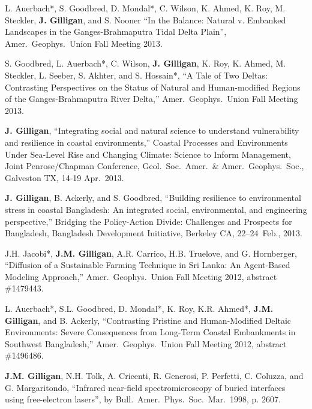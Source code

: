     \item L. Auerbach*, S. Goodbred, D. Mondal*, C. Wilson, K. Ahmed, K. Roy, M. Steckler, \textbf{J. Gilligan}, and S. Nooner
    \enquote{In the Balance: Natural v. Embanked Landscapes in the Ganges-Brahmaputra Tidal Delta Plain},
    Amer.\ Geophys.\ Union Fall Meeting 2013.
    
    \item S. Goodbred, L. Auerbach*, C. Wilson, \textbf{J. Gilligan}, K. Roy, K. Ahmed, M. Steckler, L. Seeber, S. Akhter, and S. Hossain*,
    \enquote{A Tale of Two Deltas: Contrasting Perspectives on the Status of Natural and Human-modified Regions of the Ganges-Brahmaputra River Delta,}
    Amer.\ Geophys.\ Union Fall Meeting 2013.
    
    \item \textbf{J. Gilligan},
    \enquote{Integrating social and natural science to understand vulnerability and resilience in coastal environments,}
    Coastal Processes and Environments Under Sea-Level Rise and Changing Climate: Science to Inform Management, Joint Penrose/Chapman Conference,
    Geol.\ Soc.\ Amer.\ \& Amer.\ Geophys.\ Soc., Galveston TX, 14-19 Apr.~2013.
    
    \item \textbf{J. Gilligan}, B. Ackerly, and S. Goodbred,
    \enquote{Building resilience to environmental stress in coastal Bangladesh: An integrated social, environmental, and engineering perspective,}
    Bridging the Policy-Action Divide: Challenges and Prospects for Bangladesh, Bangladesh Development Initiative, Berkeley CA, 22--24~Feb., 2013.

    \item J.H. Jacobi*, \textbf{J.M. Gilligan}, A.R. Carrico, H.B. Truelove, and G. Hornberger,
    \enquote{Diffusion of a Sustainable Farming Technique in Sri Lanka: An Agent-Based Modeling Approach,}
    Amer.\ Geophys.\ Union Fall Meeting 2012, abstract \#1479443.

    \item
    L. Auerbach*, S.L. Goodbred, D. Mondal*, K. Roy, K.R. Ahmed*, \textbf{J.M. Gilligan}, and B. Ackerly,
    \enquote{Contrasting Pristine and Human-Modified Deltaic Environments: Severe Consequences from Long-Term Coastal Embankments in Southwest Bangladesh,}
    Amer.\ Geophys.\ Union Fall Meeting 2012, abstract \#1496486.
  
    \item \textbf{J.M. Gilligan}, N.H. Tolk, A. Cricenti, R. Generosi, P. Perfetti, C. Coluzza, and G. Margaritondo, 
    \enquote{Infrared near-field spectromicroscopy of buried interfaces using free-electron lasers}, by
    Bull.\ Amer.\ Phys.\ Soc.\ Mar.~1998, p. 2607.

